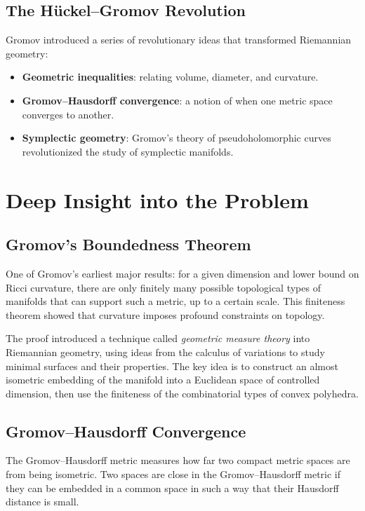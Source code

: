 \subsection{The H\"uckel--Gromov Revolution}

Gromov introduced a series of revolutionary ideas that transformed Riemannian geometry:
\begin{itemize}
\item \textbf{Geometric inequalities}: relating volume, diameter, and curvature.
\item \textbf{Gromov--Hausdorff convergence}: a notion of when one metric space converges to another.
\item \textbf{Symplectic geometry}: Gromov's theory of pseudoholomorphic curves revolutionized the study of symplectic manifolds.
\end{itemize}

\section{Deep Insight into the Problem}

\subsection{Gromov's Boundedness Theorem}

One of Gromov's earliest major results: for a given dimension and lower bound on Ricci curvature, there are only finitely many possible topological types of manifolds that can support such a metric, up to a certain scale. This finiteness theorem showed that curvature imposes profound constraints on topology.

The proof introduced a technique called \emph{geometric measure theory} into Riemannian geometry, using ideas from the calculus of variations to study minimal surfaces and their properties. The key idea is to construct an almost isometric embedding of the manifold into a Euclidean space of controlled dimension, then use the finiteness of the combinatorial types of convex polyhedra.

\subsection{Gromov--Hausdorff Convergence}

The Gromov--Hausdorff metric measures how far two compact metric spaces are from being isometric. Two spaces are close in the Gromov--Hausdorff metric if they can be embedded in a common space in such a way that their Hausdorff distance is small.

